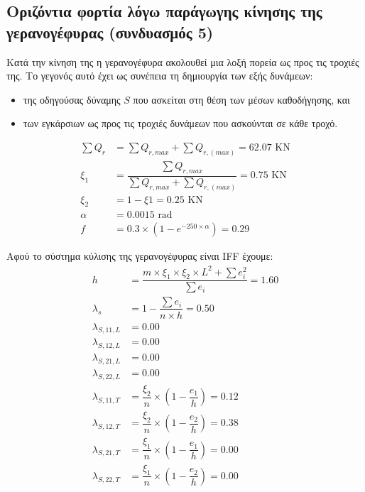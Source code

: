 
\subsection{Οριζόντια φορτία λόγω παράγωγης κίνησης της γερανογέφυρας (συνδυασμός 5)}
Κατά την κίνηση της η γερανογέφυρα ακολουθεί μια λοξή πορεία ως προς τις τροχιές της. Το γεγονός αυτό έχει ως συνέπεια τη δημιουργία των εξής δυνάμεων:
\begin{itemize} 
\item της οδηγούσας δύναμης $S$ που ασκείται στη θέση των μέσων καθοδήγησης, και
\item των εγκάρσιων ως προς τις τροχιές δυνάμεων που ασκούνται σε κάθε τροχό.
\end{itemize}

\begin{align*}
\sum{Q_r} &= \displaystyle\sum{Q_{r,max}} + \displaystyle\sum{Q_{r,(max)}} =  62.07 \text{ KN} \\ 
ξ_1    	  &= \dfrac{\displaystyle\sum{Q_{r,max}}}{\displaystyle\sum{Q_{r,max}} + \displaystyle\sum{Q_{r,(max)}}} =   0.75 \text{ KN} \\ 
ξ_2       &= 1 - ξ1 =   0.25 \text{ KN} \\ 
α    	  &= 0.0015 \text{ rad} \\ 
f         &= 0.3 \times \left(1 - e^{-250 \times α}\right) =   0.29
\end{align*}

Αφού το σύστημα κύλισης της γερανογέφυρας είναι IFF έχουμε:
\begin{align*}
h          &= \dfrac{m \times ξ_1 \times ξ_2 \times L^2 + \sum{e_i^2}}{\sum{e_i}} =   1.60 \\ 
λ_s        &= 1 - \dfrac{\sum{e_i}}{n \times h} =    0.50 \\ 
λ_{S,11,L} &=   0.00 \\ 
λ_{S,12,L} &=   0.00 \\ 
λ_{S,21,L} &=   0.00 \\ 
λ_{S,22,L} &=   0.00 \\ 
λ_{S,11,T} &= \dfrac{ξ_2}{n} \times \left(1 - \dfrac{e_1}{h}\right) =   0.12 \\ 
λ_{S,12,T} &= \dfrac{ξ_2}{n} \times \left(1 - \dfrac{e_2}{h}\right) =   0.38 \\ 
λ_{S,21,T} &= \dfrac{ξ_1}{n} \times \left(1 - \dfrac{e_1}{h}\right) =   0.00 \\ 
λ_{S,22,T} &= \dfrac{ξ_1}{n} \times \left(1 - \dfrac{e_2}{h}\right) =   0.00
\end{align*}

